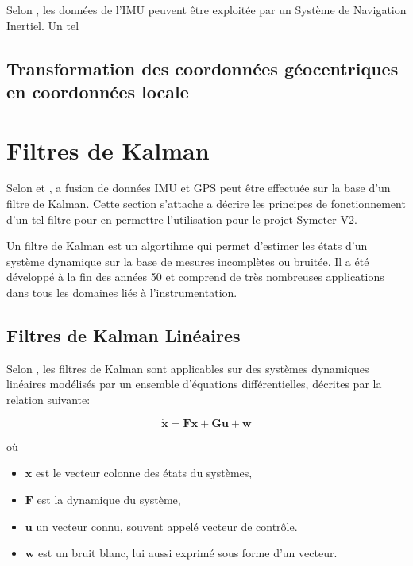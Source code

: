 \documentclass[12pt,a4paper]{report}
\begin{document}
	\para Selon \cite{gustavsson_uav_2015}, les données de l'IMU peuvent être exploitée par un Système de Navigation Inertiel. Un tel 
	
	
	\subsection{Transformation des coordonnées géocentriques en coordonnées locale}
	

	
	\section{Filtres de Kalman}
	
	Selon \cite{gustavsson_uav_2015} et \cite{menegatti_generalized_2016}, a fusion de données IMU et GPS peut être effectuée sur la base d'un filtre de Kalman. Cette section s'attache a décrire les principes de fonctionnement d'un tel filtre pour en permettre l'utilisation pour le projet Symeter V2.
	
	\para Un filtre de Kalman est un algortihme qui permet d'estimer les états d'un système dynamique sur la base  de mesures incomplètes ou bruitée. Il a été développé à la fin des années 50 et comprend de très nombreuses applications dans tous les domaines liés à l'instrumentation.
	
	\subsection{Filtres de Kalman Linéaires}
	Selon \cite{zarchan_fundamentals_2009}, les filtres de Kalman sont applicables sur des systèmes dynamiques linéaires modélisés par un ensemble d'équations différentielles, décrites par la relation suivante:
	
	\begin{equation}
		\label{eq:fullmodel}
	\boldsymbol{
		\dot{x} = Fx + Gu + w
	}
	\end{equation}
	
	\para où

	\begin{itemize}
	\item $\boldsymbol{x}$ est le vecteur colonne des états du systèmes, 
	\item $\boldsymbol{F}$ est la dynamique du système, 
	\item $\boldsymbol{u}$  un vecteur connu, souvent appelé vecteur de contrôle.
	\item $\boldsymbol{w}$ est un bruit blanc, lui aussi exprimé sous forme d'un vecteur.
	\end{itemize}
\end{document}
